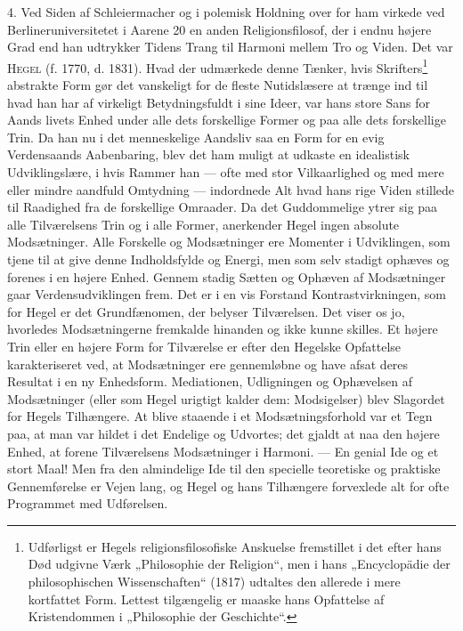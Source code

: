 \documentclass[12pt,a4paper,openany]{book}
\newcommand{\opage}[1]{\marginnote{\footnotesize\textit{[#1]}}}
\begin{document}
4. Ved Siden af Schleiermacher og i polemisk Holdning
over for ham virkede ved Berlineruniversitetet i
Aarene 20 en anden Religionsfilosof, der i endnu højere
Grad end han udtrykker Tidens Trang til Harmoni mellem
Tro og Viden. Det var \textsc{Hegel} (f. 1770, d. 1831).
Hvad der udmærkede denne Tænker, hvis Skrifters\footnote{Udførligst er Hegels religionsfilosofiske Anskuelse fremstillet i det efter hans Død udgivne Værk „Philosophie der Religion“, men i hans „Encyclopädie der philosophischen Wissenschaften“ (1817) udtaltes den allerede i mere kortfattet Form. Lettest tilgængelig er maaske hans Opfattelse af Kristendommen i „Philosophie der Geschichte“.}
abstrakte Form gør det vanskeligt for de fleste Nutidslæsere
at trænge ind til hvad han har af virkeligt Betydningsfuldt
i sine Ideer, var hans store Sans for Aands%
\opage{11}livets Enhed under alle dets forskellige Former og paa
alle dets forskellige Trin. Da han nu i det menneskelige
Aandsliv saa en Form for en evig Verdensaands Aabenbaring,
blev det ham muligt at udkaste en idealistisk
Udviklingslære, i hvis Rammer han --- ofte med stor Vilkaarlighed
og med mere eller mindre aandfuld Omtydning
--- indordnede Alt hvad hans rige Viden stillede til
Raadighed fra de forskellige Omraader. Da det Guddommelige
ytrer sig paa alle Tilværelsens Trin og i alle
Former, anerkender Hegel ingen absolute Modsætninger.
Alle Forskelle og Modsætninger ere Momenter i Udviklingen,
som tjene til at give denne Indholdsfylde og
Energi, men som selv stadigt ophæves og forenes i en
højere Enhed. Gennem stadig Sætten og Ophæven af
Modsætninger gaar Verdensudviklingen frem. Det er i
en vis Forstand Kontrastvirkningen, som for Hegel er
det Grundfænomen, der belyser Tilværelsen. Det viser
os jo, hvorledes Modsætningerne fremkalde hinanden og
ikke kunne skilles. Et højere Trin eller en højere Form
for Tilværelse er efter den Hegelske Opfattelse karakteriseret
ved, at Modsætninger ere gennemløbne og have
afsat deres Resultat i en ny Enhedsform. Mediationen,
Udligningen og Ophævelsen af Modsætninger (eller som
Hegel urigtigt kalder dem: Modsigelser) blev Slagordet
for Hegels Tilhængere. At blive staaende i et
Modsætningsforhold var et Tegn paa, at man var hildet
i det Endelige og Udvortes; det gjaldt at naa den højere
Enhed, at forene Tilværelsens Modsætninger i Harmoni.
--- En genial Ide og et stort Maal! Men fra den almindelige
Ide til den specielle teoretiske og praktiske Gennemførelse
er Vejen lang, og Hegel og hans Tilhængere
forvexlede alt for ofte Programmet med Udførelsen.
\end{document}
